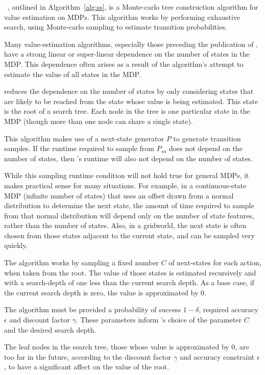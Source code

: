 ~\cite{kearns99}, outlined in Algorithm~\ref{alg:ss}, is a Monte-carlo tree construction algorithm for value estimation on MDPs. This algorithm works by performing exhaustive search, using Monte-carlo sampling to estimate transition probabilities.

Many value-estimation algorithms, especially those preceding the publication of , have a strong linear or super-linear dependence on the number of states in the MDP. This dependence often arises as a result of the algorithm's attempt to estimate the value of all states in the MDP.

 reduces the dependence on the number of states by only considering states that are likely to be reached from the state whose value is being estimated. This state is the root of a search tree. Each node in the tree is one particular state in the MDP (though more than one node can share a single state).

This algorithm makes use of a next-state generator $P$ to generate transition samples. If the runtime required to sample from $P_{sa}$ does not depend on the number of states, then 's runtime will also not depend on the number of states.

While this sampling runtime condition will not hold true for general MDPs, it makes practical sense for many situations. For example, in a continuous-state MDP (infinite number of states) that uses an offset drawn from a normal distribution to determine the next state, the amount of time required to sample from that normal distribution will depend only on the number of state features, rather than the number of states. Also, in a gridworld, the next state is often chosen from those states adjacent to the current state, and can be sampled very quickly.

The  algorithm works by sampling a fixed number $C$ of next-states for each action, when taken from the root. The value of those states is estimated recursively and with a search-depth of one less than the current search depth. As a base case, if the current search depth is zero, the value is approximated by $0$.

The algorithm must be provided a probability of success $1-\delta$, required accuracy $\epsilon$ and discount factor $\gamma$. These parameters inform 's choice of the parameter $C$ and the desired search depth.

The leaf nodes in the search tree, those whose value is approximated by $0$, are too far in the future, according to the discount factor $\gamma$ and accuracy constraint $\epsilon$, to have a significant affect on the value of the root.


